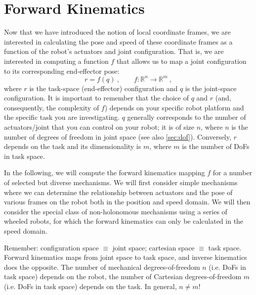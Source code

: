 \section{Forward Kinematics}\label{sec:kinematics:fwk}

Now that we have introduced the notion of local coordinate frames, we are interested in calculating the pose and speed of these coordinate frames as a function of the robot's actuators and joint configuration.
That is, we are interested in computing a function $f$ that allows us to map a joint configuration to its corresponding end-effector pose:
\begin{equation}\label{eq:kinematics:forward}
r=f(q)\ , \qquad f : \mathbb{R}^n \rightarrow \mathbb{R}^m \ ,
\end{equation}
where $r$ is the task-space (end-effector) configuration and $q$ is the joint-space configuration.
It is important to remember that the choice of $q$ and $r$ (and, consequently, the complexity of $f$) depends on your specific robot platform and the specific task you are investigating.
$q$ generally corresponds to the number of actuators/joint that you can control on your robot; it is of size $n$, where $n$ is the number of degrees of freedom in joint space (see also \cref{sec:dof}).
Conversely, $r$ depends on the task and its dimensionality is $m$, where $m$ is the number of DoFs in task space.

In the following, we will compute the forward kinematics mapping $f$ for a number of selected but diverse mechanisms.
We will first consider simple mechanisms where we can determine the relationship between actuators and the pose of various frames on the robot both in the position and speed domain.
We will then consider the special class of non-holonomous mechanisms using a series of wheeled robots, for which the forward kinematics can only be calculated in the speed domain.

\begin{mdframed}
\noindent Remember:
configuration space $\equiv$ joint space;
cartesian space $\equiv$ task space.
Forward kinematics maps from joint space to task space, and inverse kinematics does the opposite.
The number of mechanical degrees-of-freedom $n$ (i.e. DoFs in task space) depends on the robot, the number of Cartesian degrees-of-freedom $m$ (i.e. DoFs in task space) depends on the task. In general, $n \neq m$!
\end{mdframed}

